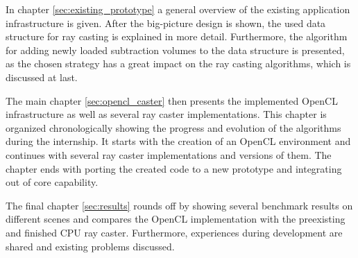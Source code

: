 In chapter \ref{sec:existing_prototype} a general overview of the existing application infrastructure is given. After the big-picture design is shown, the used data structure for ray casting is explained in more detail. Furthermore, the algorithm for adding newly loaded subtraction volumes to the data structure is presented, as the chosen strategy has a great impact on the ray casting algorithms, which is discussed at last.

The main chapter \ref{sec:opencl_caster} then presents the implemented OpenCL infrastructure as well as several ray caster implementations. This chapter is organized chronologically showing the progress and evolution of the algorithms during the internship. It starts with the creation of an OpenCL environment and continues with several ray caster implementations and versions of them. The chapter ends with porting the created code to a new prototype and integrating out of core capability.

The final chapter \ref{sec:results} rounds off by showing several benchmark results on different scenes and compares the OpenCL implementation with the preexisting and finished CPU ray caster. Furthermore, experiences during development are shared and existing problems discussed.
 